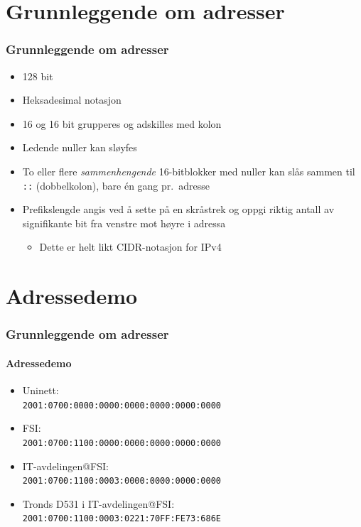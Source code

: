 \section{Grunnleggende om adresser}
\begin{frame}%
  \frametitle{Grunnleggende om adresser}
  \pause
  \begin{itemize}[<+->]
  \item 128 bit
  \item Heksadesimal notasjon
  \item 16 og 16 bit grupperes og adskilles med kolon
  \item Ledende nuller kan sløyfes
  \item To eller flere \textit{sammenhengende\/} 16-bitblokker med
    nuller kan slås sammen til \texttt{::} (dobbelkolon), bare én gang
    pr.\ adresse
  \item Prefikslengde angis ved å sette på en skråstrek og oppgi
    riktig antall av signifikante bit fra venstre mot høyre i adressa
    \begin{itemize}[<+->]
    \item Dette er helt likt CIDR-notasjon for IPv4 
    \end{itemize}
  \end{itemize}
\end{frame}

\section{Adressedemo}
\begin{frame}%
  \frametitle{Grunnleggende om adresser}
  \framesubtitle{Adressedemo}
  \pause
  \begin{itemize}[<+->]
  \item Uninett:\\\texttt{2001:0700:0000:0000:0000:0000:0000:0000\phantom{/32}}
  \item FSI:\\\texttt{2001:0700:1100:0000:0000:0000:0000:0000\phantom{/48}}
  \item IT-avdelingen@FSI:\\\texttt{2001:0700:1100:0003:0000:0000:0000:0000\phantom{/64}}
  \item Tronds D531 i IT-avdelingen@FSI:\\\texttt{2001:0700:1100:0003:0221:70FF:FE73:686E\phantom{/128}}
  \end{itemize}
\end{frame}

